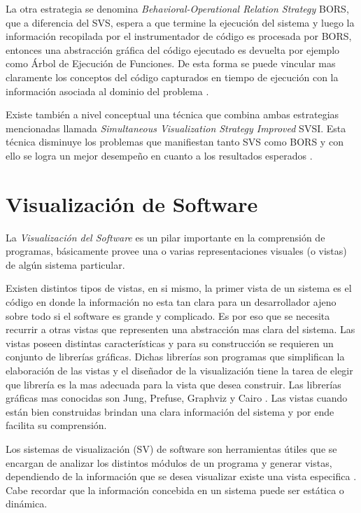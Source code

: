 \documentclass[12pt]{report}
\begin{document}
La otra estrategia se denomina \textit{Behavioral-Operational Relation Strategy} BORS, que a diferencia del SVS, espera a que termine la ejecución del sistema y luego la información recopilada por el instrumentador de código es procesada por BORS, entonces una abstracción gráfica del código ejecutado es devuelta por ejemplo como Árbol de Ejecución de Funciones. De esta forma se puede vincular mas claramente los conceptos del código capturados en tiempo de ejecución con la información asociada al dominio del problema \cite{BRM10,MPMR07}.

Existe también a nivel conceptual una técnica que combina ambas estrategias mencionadas llamada \textit{Simultaneous Visualization Strategy Improved} SVSI. Esta técnica disminuye los problemas que manifiestan tanto SVS como BORS y con ello se logra un mejor desempeño en cuanto a los resultados esperados \cite{BRM10,MPMR07}.

\section{Visualización de Software}

La \textit{Visualización del Software} es un pilar importante en la comprensión de programas, básicamente provee una o varias representaciones visuales (o vistas) de algún sistema particular. 

Existen distintos tipos de vistas, en si mismo, la primer vista de un sistema es el código en donde la información no esta tan clara para un desarrollador ajeno sobre todo si el software es grande y complicado. Es por eso que se necesita recurrir a otras vistas que representen una abstracción mas clara del sistema.
Las vistas poseen distintas características y para su construcción se requieren un conjunto de librerías gráficas. Dichas librerías son programas que simplifican la elaboración de las vistas y el diseñador de la visualización tiene la tarea de elegir que librería es la mas adecuada para la vista que desea construir. Las librerías gráficas mas conocidas son Jung, Prefuse, Graphviz y Cairo \cite{BRM10}. Las vistas cuando están bien construidas brindan una clara información del sistema y por ende facilita su comprensión. 

Los sistemas de visualización (SV) de software son herramientas útiles que se encargan de analizar los distintos módulos de un programa y generar vistas, dependiendo de la información que se desea visualizar existe una vista especifica \cite{MPMR07}. Cabe recordar que la información concebida en un sistema puede ser estática o dinámica.
\end{document}
